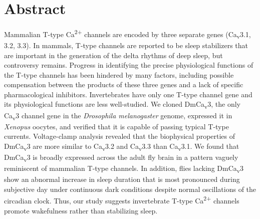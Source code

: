 \section*{Abstract}

Mammalian T-type Ca\textsuperscript{2+} channels are encoded by three separate genes (Ca\textsubscript{v}3.1, 3.2, 3.3).
In mammals, T-type channels are reported to be sleep stabilizers that are important in the generation of the delta rhythms of deep sleep, but controversy remains.
Progress in identifying the precise physiological functions of the T-type channels has been hindered by many factors, including possible compensation between the products of these three genes and a lack of specific pharmacological inhibitors.
Invertebrates have only one T-type channel gene and its physiological functions are less well-studied.
We cloned DmCa\textsubscript{v}3, the only Ca\textsubscript{v}3 channel gene in the \emph{Drosophila melanogaster} genome, expressed it in \emph{Xenopus} oocytes, and verified that it is capable of passing typical T-type currents.
Voltage-clamp analysis revealed that the biophysical properties of DmCa\textsubscript{v}3 are more similar to Ca\textsubscript{v}3.2 and Ca\textsubscript{v}3.3 than Ca\textsubscript{v}3.1.
We found that DmCa\textsubscript{v}3 is broadly expressed across the adult fly brain in a pattern vaguely reminiscent of mammalian T-type channels.
In addition, flies lacking DmCa\textsubscript{v}3 show an abnormal increase in sleep duration that is most pronounced during subjective day under continuous dark conditions despite normal oscillations of the circadian clock.
Thus, our study suggests invertebrate T-type Ca\textsuperscript{2+} channels promote wakefulness rather than stabilizing sleep.
